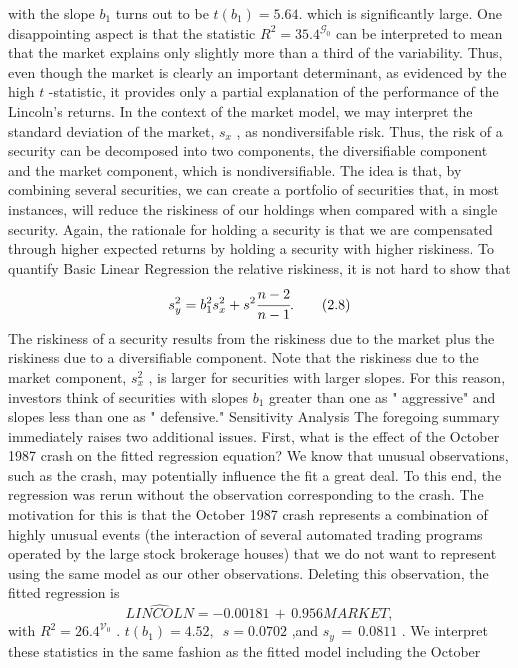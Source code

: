 \documentclass[11pt]{article}
\begin{document}
with the slope \(b_{1}\) turns out to be \(t ( b_{1} )=5 . 6 4 .\) which is significantly large. One
 disappointing aspect is that the statistic \(R^{2}=3 5 . 4^{\mathcal{G}_{0}}\) can be interpreted to mean
 that the market explains only slightly more than a third of the variability. Thus,
even though the market is clearly an important determinant, as evidenced by the
high \(t\) -statistic, it provides only a partial explanation of the performance of the
Lincoln's returns.
In the context of the market model, we may interpret the standard deviation
of the market, \(s_{x}\) , as nondiversifable risk. Thus, the risk of a security can be
decomposed into two components, the diversifiable component and the market
component, which is nondiversifiable. The idea is that, by combining several
securities, we can create a portfolio of securities that, in most instances, will
reduce the riskiness of our holdings when compared with a single security.
Again, the rationale for holding a security is that we are compensated through
higher expected returns by holding a security with higher riskiness. To quantify
 Basic Linear Regression
 the relative riskiness, it is not hard to show that
\[
s_{y}^{2}=b_{1}^{2} s_{x}^{2}+s^{2} \cfrac{n-2} {n-1} . \tag{2.8}
\]
The riskiness of a security results from the riskiness due to the market plus
the riskiness due to a diversifiable component. Note that the riskiness due to the
 market component, \(s_{x}^{2}\) , is larger for securities with larger slopes. For this reason,
investors think of securities with slopes \(b_{1}\) greater than one as " aggressive" and
slopes less than one as " defensive."
Sensitivity Analysis
The foregoing summary immediately raises two additional issues. First, what
is the effect of the October 1987 crash on the fitted regression equation? We
 know that unusual observations, such as the crash, may potentially influence the
fit a great deal. To this end, the regression was rerun without the observation
 corresponding to the crash. The motivation for this is that the October 1987 crash
represents a combination of highly unusual events (the interaction of several
 automated trading programs operated by the large stock brokerage houses) that
we do not want to represent using the same model as our other observations.
Deleting this observation, the fitted regression is
\[
\widehat{L I N C O L N}=-0 . 0 0 1 8 1 \,+\, 0 . 9 5 6 M A R K E T ,
\]
with \(R^{2}=2 6 . 4^{\mathcal{V}_{0}}\) . \(t ( b_{1} )=4 . 5 2 , \, \, \, s=0 . 0 7 0 2\) ,and \(s_{y} \,=\, 0 . 0 8 1 1\) . We interpret
these statistics in the same fashion as the fitted model including the October
\end{document}
